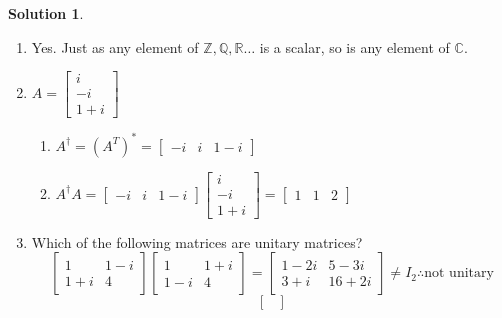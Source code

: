 \documentclass[10pt]{article}
\theoremstyle{definition}
\newtheorem{soln}{Solution}
\begin{document}
\begin{soln}~
  \begin{enumerate}[label=(\alph*)]
    \item Yes. Just as any element of $\mathbb{Z},\mathbb{Q},\mathbb{R}\ldots$ is a scalar, so is any element of $\mathbb{C}$.
    \item $\displaystyle A=\begin{bmatrix}
              i  \\
              -i \\
              1+i
            \end{bmatrix}$
          \begin{enumerate}[label=(\roman*)]
            \item $A^\dagger=(A^T)^*=\begin{bmatrix}
                      -i & i & 1-i
                    \end{bmatrix}$
            \item $A^\dagger A=\begin{bmatrix}
                      -i & i & 1-i
                    \end{bmatrix}\begin{bmatrix}
                      i  \\
                      -i \\
                      1+i
                    \end{bmatrix}=\begin{bmatrix}
                      1 & 1 & 2
                    \end{bmatrix}$
          \end{enumerate}
    \item Which of the following matrices are unitary matrices?
          $$
            \begin{bmatrix}
              1   & 1-i \\
              1+i & 4
            \end{bmatrix}            \begin{bmatrix}
              1   & 1+i \\
              1-i & 4
            \end{bmatrix}=\begin{bmatrix}
              1-2i & 5-3i  \\
              3+i  & 16+2i
            \end{bmatrix}\neq I_2 \therefore \text{not unitary}
          $$
          $$
            \begin{bmatrix}

\end{bmatrix}$$
\end{enumerate}
\end{soln}
\end{document}
